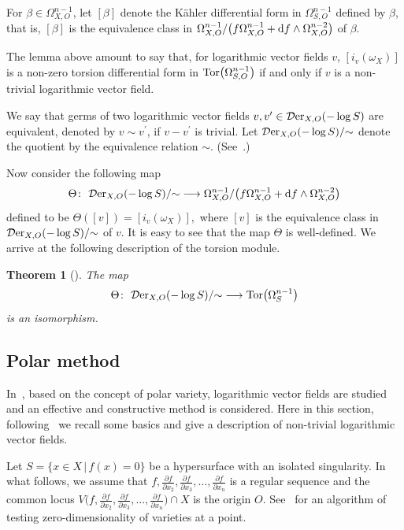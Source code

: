 \documentclass[10pt,a4paper]{amsart}
\numberwithin{equation}{section}
\newtheorem{Theorem}{Theorem}[section]
\begin{document}
For $\beta \in \Omega_{X, O}^{n-1}$, let $[\beta]$ denote the K\"ahler differential form in $\Omega_{S, O}^{n-1}$ defined by $\beta$, that is, $[\beta]$ is the equivalence class in
$\Omega_{X, O}^{n-1} /\big(f \Omega_{X, O}^{n-1} + {\rm d}f\wedge \Omega_{X, O}^{n-2}\big)$ of $\beta$.


The lemma above amount to say that, for logarithmic vector fields $v$,
$[i_{v}(\omega_X)]$ is a non-zero torsion differential form
in ${\rm Tor}\big(\Omega_{S,O}^{n-1}\big)$ if and only if $v$ is a non-trivial logarithmic vector field.

We say that germs of two logarithmic vector fields $v, v^{\prime} \in {\mathcal D}{\rm er}_{X, O}(-\log S)$ are equivalent, denoted by $ v \sim v^{\prime} $, if $ v-v^{\prime} $ is trivial.
Let ${\mathcal D}{\rm er}_{X, O}(-\log S)/{\sim}$ denote the quotient by the equivalence relation $\sim$. (See~\cite{T}.)

Now consider the following map
\begin{gather*}
 \Theta\colon\ {\mathcal D}{\rm er}_{X, O}(-\log S)/{\sim} \longrightarrow
\Omega_{X, O}^{n-1} /\big(f \Omega_{X, O}^{n-1} + {\rm d}f\wedge \Omega_{X, O}^{n-2}\big)
\end{gather*}
defined to be $ \Theta([v]) = [i_{v}(\omega_X)], $ where $ [v] $ is the equivalence class in
${\mathcal D}{\rm er}_{X, O}(-\log S)/{\sim}$ of $v$. It is easy to see that the map $\Theta$ is well-defined. We arrive at the following description of the torsion module.

\begin{Theorem}[\cite{TN20}]
The map
\begin{gather*}
\Theta\colon\ {\mathcal D}{\rm er}_{X, O}(-\log S)/{\sim} \longrightarrow {\rm Tor}\big(\Omega_{S}^{n-1}\big)
\end{gather*}
is an isomorphism.
\end{Theorem}

\subsection{Polar method}

In~\cite{T}, based on the concept of polar variety, logarithmic vector fields are studied and an effective and constructive method is considered. Here in this section, following~\cite{NT19a, T} we recall some basics and give a description of non-trivial logarithmic vector fields.

Let $S =\{x \in X \,|\, f(x) =0\} $ be a hypersurface with an isolated singularity. In what fol\-lows,
we assume that $f, \frac{\partial f}{\partial x_2}, \frac{\partial f}{\partial x_3}, \ldots, \frac{\partial f}{\partial x_{n}}$ is a regular sequence and the common \mbox{locus}
$V\big(f, \frac{\partial f}{\partial x_2}, \frac{\partial f}{\partial x_3},\ldots,\allowbreak\frac{\partial f}{\partial x_{n}}\big)\cap X$
is the origin $O$. See~\cite{NT20b} for an algorithm of testing zero-dimensiona\-lity of varieties at a point.
\end{document}
